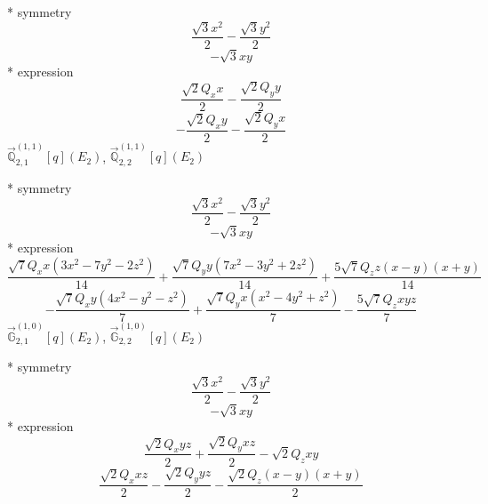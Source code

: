 \documentclass[fleqn,8pt]{jsarticle}
\begin{document}
\noindent\quad ** symmetry
\begin{dmath*}
\frac{\sqrt{3} x^{2}}{2} - \frac{\sqrt{3} y^{2}}{2}
\end{dmath*}
\begin{dmath*}
- \sqrt{3} x y
\end{dmath*}
\noindent\quad ** expression
\begin{dmath*}
\frac{\sqrt{2} Q_{x} x}{2} - \frac{\sqrt{2} Q_{y} y}{2}
\end{dmath*}
\begin{dmath*}
- \frac{\sqrt{2} Q_{x} y}{2} - \frac{\sqrt{2} Q_{y} x}{2}
\end{dmath*}
\noindent\quad $\vec{\mathbb{Q}}_{2,1}^{(1,1)}[q](E_{2})$, $\vec{\mathbb{Q}}_{2,2}^{(1,1)}[q](E_{2})$

\noindent\quad ** symmetry
\begin{dmath*}
\frac{\sqrt{3} x^{2}}{2} - \frac{\sqrt{3} y^{2}}{2}
\end{dmath*}
\begin{dmath*}
- \sqrt{3} x y
\end{dmath*}
\noindent\quad ** expression
\begin{dmath*}
\frac{\sqrt{7} Q_{x} x \left(3 x^{2} - 7 y^{2} - 2 z^{2}\right)}{14} + \frac{\sqrt{7} Q_{y} y \left(7 x^{2} - 3 y^{2} + 2 z^{2}\right)}{14} + \frac{5 \sqrt{7} Q_{z} z \left(x - y\right) \left(x + y\right)}{14}
\end{dmath*}
\begin{dmath*}
- \frac{\sqrt{7} Q_{x} y \left(4 x^{2} - y^{2} - z^{2}\right)}{7} + \frac{\sqrt{7} Q_{y} x \left(x^{2} - 4 y^{2} + z^{2}\right)}{7} - \frac{5 \sqrt{7} Q_{z} x y z}{7}
\end{dmath*}
\noindent\quad $\vec{\mathbb{G}}_{2,1}^{(1,0)}[q](E_{2})$, $\vec{\mathbb{G}}_{2,2}^{(1,0)}[q](E_{2})$

\noindent\quad ** symmetry
\begin{dmath*}
\frac{\sqrt{3} x^{2}}{2} - \frac{\sqrt{3} y^{2}}{2}
\end{dmath*}
\begin{dmath*}
- \sqrt{3} x y
\end{dmath*}
\noindent\quad ** expression
\begin{dmath*}
\frac{\sqrt{2} Q_{x} y z}{2} + \frac{\sqrt{2} Q_{y} x z}{2} - \sqrt{2} Q_{z} x y
\end{dmath*}
\begin{dmath*}
\frac{\sqrt{2} Q_{x} x z}{2} - \frac{\sqrt{2} Q_{y} y z}{2} - \frac{\sqrt{2} Q_{z} \left(x - y\right) \left(x + y\right)}{2}
\end{dmath*}
\end{document}
